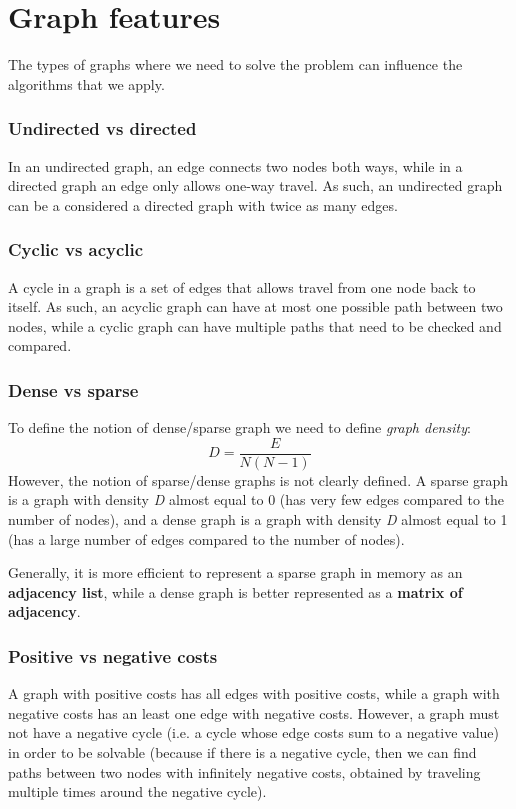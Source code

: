 \documentclass[runningheads]{llncs}
\begin{document}
\section{Graph features}
The types of graphs where we need to solve the problem can influence the algorithms that we apply.
\subsubsection{Undirected vs directed}
In an undirected graph, an edge connects two nodes both ways, while in a directed graph an edge only allows one-way travel. As such, an undirected graph can be a considered a directed graph with twice as many edges.

\subsubsection{Cyclic vs acyclic}
A cycle in a graph is a set of edges that allows travel from one node back to itself. As such, an acyclic graph can have at most one possible path between two nodes, while a cyclic graph can have multiple paths that need to be checked and compared.

\subsubsection{Dense vs sparse}
To define the notion of dense/sparse graph we need to define \textit{graph density}\cite{ref_url_dense}:
\begin{equation}
D = \frac{E}{N(N-1)}
\end{equation}
However, the notion of sparse/dense graphs is not clearly defined. A sparse graph is a graph with density \textit{D} almost equal to 0 (has very few edges compared to the number of nodes), and a dense graph is a graph with density \textit{D} almost equal to 1 (has a large number of edges compared to the number of nodes).

Generally, it is more efficient to represent a sparse graph in memory as an \textbf{adjacency list}, while a dense graph is better represented as a \textbf{matrix of adjacency}.

\subsubsection{Positive vs negative costs}
A graph with positive costs has all edges with positive costs, while a graph with negative costs has an least one edge with negative costs. However, a graph must not have a negative cycle (i.e. a cycle whose edge costs sum to a negative value) in order to be solvable (because if there is a negative cycle, then we can find paths between two nodes with infinitely negative costs, obtained by traveling multiple times around the negative cycle).
\end{document}
